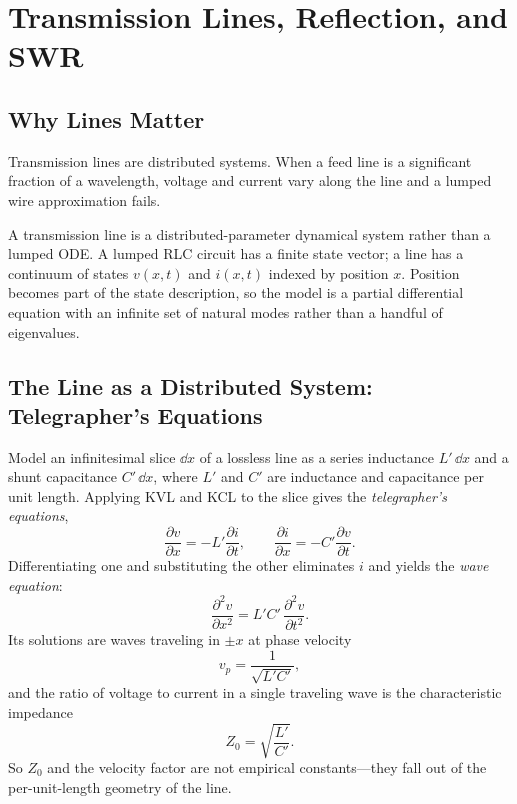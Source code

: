 \chapter{Transmission Lines, Reflection, and SWR}
\label{ch:lines}
\section{Why Lines Matter}
Transmission lines are distributed systems. When a feed line is a significant
fraction of a wavelength, voltage and current vary along the line and a lumped
wire approximation fails.

\begin{controlsbox}
A transmission line is a distributed-parameter dynamical system rather than a
lumped ODE. A lumped RLC circuit has a finite state vector; a line has a
continuum of states \(v(x,t)\) and \(i(x,t)\) indexed by position \(x\). Position
becomes part of the state description, so the model is a partial differential
equation with an infinite set of natural modes rather than a handful of
eigenvalues.
\end{controlsbox}

\section{The Line as a Distributed System: Telegrapher's Equations}
Model an infinitesimal slice \(\dd x\) of a lossless line as a series inductance
\(L'\,\dd x\) and a shunt capacitance \(C'\,\dd x\), where \(L'\) and \(C'\) are
inductance and capacitance per unit length. Applying KVL and KCL to the slice
gives the \emph{telegrapher's equations},
\[
\frac{\partial v}{\partial x}=-L'\frac{\partial i}{\partial t},
\qquad
\frac{\partial i}{\partial x}=-C'\frac{\partial v}{\partial t}.
\]
Differentiating one and substituting the other eliminates \(i\) and yields the
\emph{wave equation}:
\[
\frac{\partial^2 v}{\partial x^2}=L'C'\,\frac{\partial^2 v}{\partial t^2}.
\]
Its solutions are waves traveling in \(\pm x\) at phase velocity
\[
v_p=\frac{1}{\sqrt{L'C'}},
\]
and the ratio of voltage to current in a single traveling wave is the
characteristic impedance
\[
Z_0=\sqrt{\frac{L'}{C'}}.
\]
So \(Z_0\) and the velocity factor are not empirical constants---they fall out of
the per-unit-length geometry of the line.

